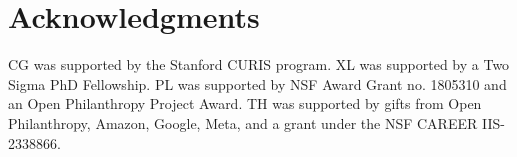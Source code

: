 \section*{Acknowledgments}

CG was supported by the Stanford CURIS program. XL was supported by a Two Sigma PhD Fellowship. PL was supported by NSF Award Grant no. 1805310 and an Open Philanthropy Project Award. TH was supported by gifts from Open Philanthropy, Amazon, Google, Meta, and a grant under the NSF CAREER IIS-2338866.
